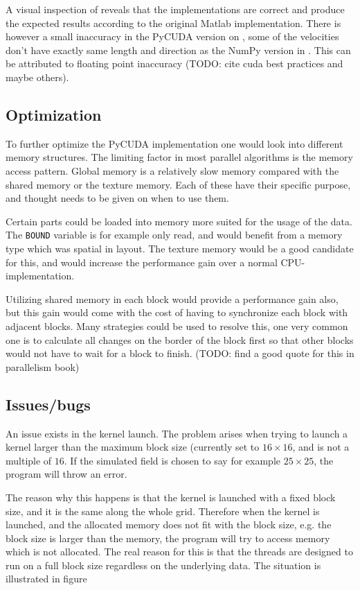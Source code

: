A visual inspection of  reveals that the implementations are correct and produce the expected results according to the original Matlab implementation. There is however a small inaccuracy in the PyCUDA version on , some of the velocities don't have exactly same length and direction as the NumPy version in . This can be attributed to floating point inaccuracy (TODO: cite cuda best practices and maybe others).



\subsection{Optimization}
To further optimize the PyCUDA implementation one would look into different memory structures. The limiting factor in most parallel algorithms is the memory access pattern. Global memory is a relatively slow memory compared with the shared memory or the texture memory. Each of these have their specific purpose, and thought needs to be given on when to use them.

Certain parts could be loaded into memory more suited for the usage of the data. The \texttt{BOUND} variable is for example only read, and would benefit from a memory type which was spatial in layout. The texture memory would be a good candidate for this, and would increase the performance gain over a normal CPU-implementation.

Utilizing shared memory in each block would provide a performance gain also, but this gain would come with the cost of having to synchronize each block with adjacent blocks. Many strategies could be used to resolve this, one very common one is to calculate all changes on the border of the block first so that other blocks would not have to wait for a block to finish. (TODO: find a good quote for this in parallelism book)



\subsection{Issues/bugs}
An issue exists in the kernel launch. The problem arises when trying to launch a kernel larger than the maximum block size (currently set to $16\times16$, and is not a multiple of $16$. If the simulated field is chosen to say for example $25\times25$, the program will throw an error.

The reason why this happens is that the kernel is launched with a fixed block size, and it is the same along the whole grid. Therefore when the kernel is launched, and the allocated memory does not fit with the block size, e.g. the block size is larger than the memory, the program will try to access memory which is not allocated. The real reason for this is that the threads are designed to run on a full block size regardless on the underlying data. The situation is illustrated in figure 

